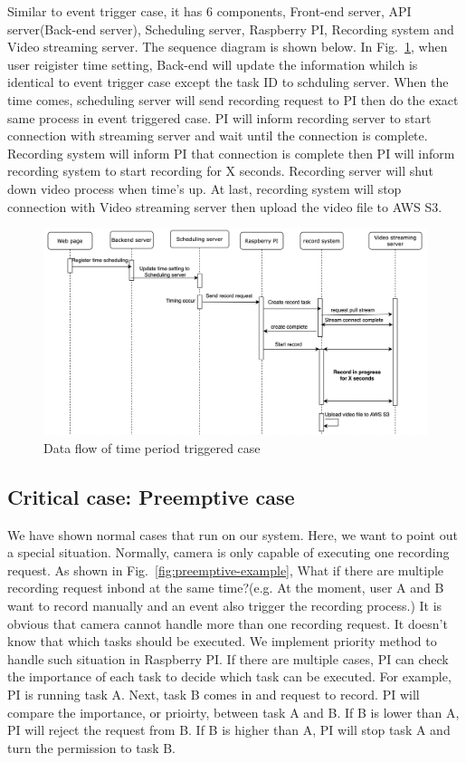 Similar to event trigger case, it has 6 components, Front-end server, API server(Back-end server), Scheduling server, Raspberry PI, Recording system and Video streaming server. The sequence diagram is shown below. In Fig.~\ref{fig:time-sequence-diagram}, when user reigister time setting, Back-end will update the information whilch is identical to event trigger case except the task ID to schduling server. When the time comes, scheduling server will send recording request to PI then do the exact same process in event triggered case. PI will inform recording server to start connection with streaming server and wait until the connection is complete. Recording system will inform PI that connection is complete then PI will inform recording system to start recording for X seconds. Recording server will shut down video process when time's up. At last, recording system will stop connection with Video streaming server then upload the video file to AWS S3.

\begin{figure}[H]
    \centering
    \includegraphics[width=\textwidth]{figsrc/time-sequence-diagram.png}
    \caption{Data flow of time period triggered case\label{fig:time-sequence-diagram}}
\end{figure}

\subsection{Critical case: Preemptive case}
We have shown normal cases that run on our system. Here, we want to point out a special situation. Normally, camera is only capable of executing one recording request. As shown in Fig.~\ref{fig:preemptive-example}, What if there are multiple recording request inbond at the same time?(e.g. At the moment, user A and B want to record manually and an event also trigger the recording process.) It is obvious that camera cannot handle more than one recording request. It doesn't know that which tasks should be executed. We implement priority method to handle such situation in Raspberry PI. If there are multiple cases, PI can check the importance of each task to decide which task can be executed. For example, PI is running task A. Next, task B comes in and request to record. PI will compare the importance, or prioirty, between task A and B. If B is lower than A, PI will reject the request from B. If B is higher than A, PI will stop task A and turn the permission to task B.


